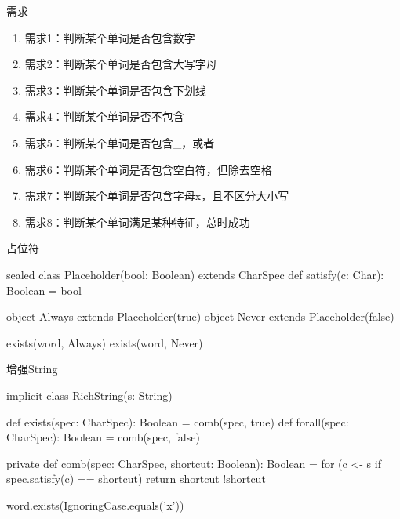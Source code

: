\begin{frame}{需求}
  \begin{block}{}
    \begin{enumerate}
    \item \alert{需求1}：判断某个单词是否包含数字
    \item \alert{需求2}：判断某个单词是否包含大写字母
    \item \alert{需求3}：判断某个单词是否包含下划线 
    \item \alert{需求4}：判断某个单词是否不包含\_
    \item \alert{需求5}：判断某个单词是否包含\_，或者\*     
    \item \alert{需求6}：判断某个单词是否包含空白符，但除去空格
    \item \alert{需求7}：判断某个单词是否包含字母x，且不区分大小写
    \item \alert{需求8}：判断某个单词满足某种特征，总时成功    
    \end{enumerate}
  \end{block}
\end{frame}

\begin{frame}[fragile]{占位符}
  \begin{scala}
sealed class Placeholder(bool: Boolean) extends CharSpec {
  def satisfy(c: Char): Boolean = bool
}

object Always extends Placeholder(true)
object Never  extends Placeholder(false)

exists(word, Always)
exists(word, Never)
  \end{scala}
\end{frame}

\begin{frame}[fragile]{增强String}
  \begin{scala}
implicit class RichString(s: String) {
  def exists(spec: CharSpec): Boolean = comb(spec, true)
  def forall(spec: CharSpec): Boolean = comb(spec, false)

  private def comb(spec: CharSpec, shortcut: Boolean): Boolean = {
    for (c <- s if spec.satisfy(c) == shortcut) 
      return shortcut
    !shortcut
  }  
}

word.exists(IgnoringCase.equals('x'))
  \end{scala}
\end{frame}
